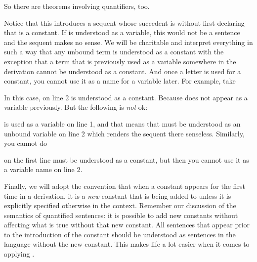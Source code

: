 So there are theorems involving quantifiers, too.


Notice that this introduces a sequent whose succedent is  
without first declaring that  is a constant.  If  is understood as a 
variable, this would not be a sentence and the sequent makes no sense. We will 
be charitable and interpret everything in such a way that any unbound term is 
understood as a constant with the exception that a term that is previously used 
as a variable somewhere in the derivation  cannot be understood as a constant.  
And once a letter is used for a constant, you cannot use it as a name for a 
variable later.
For example, take

\begin{argument*}

 

\end{argument*}

In this case,  on line 2 is understood as a constant. Because  does 
not appear as a variable previously. But the following is \emph{not} ok:

\begin{argument*}

 

\end{argument*}

 is used as a variable on line 1, and that means that  must be 
understood as an unbound variable on line 2 which renders the sequent there 
senseless. Similarly, you cannot do

\begin{argument*}



\end{argument*}

 on the first line must be understood as a constant, but then you cannot 
use it as a variable name on line 2.

Finally, we will adopt the convention that when a constant appears for the first 
time in a derivation, it is a \emph{new} constant that is being added to \lL[Q] 
unless it is explicitly specified otherwise in the context.
Remember our discussion of the semantics of quantified sentences: it is possible 
to add new constants without affecting what is true without that new constant.  
All sentences that appear prior to the introduction of the constant should be 
understood as sentences in the language without the new constant. This makes 
life a lot easier when it comes to applying \uniI.

